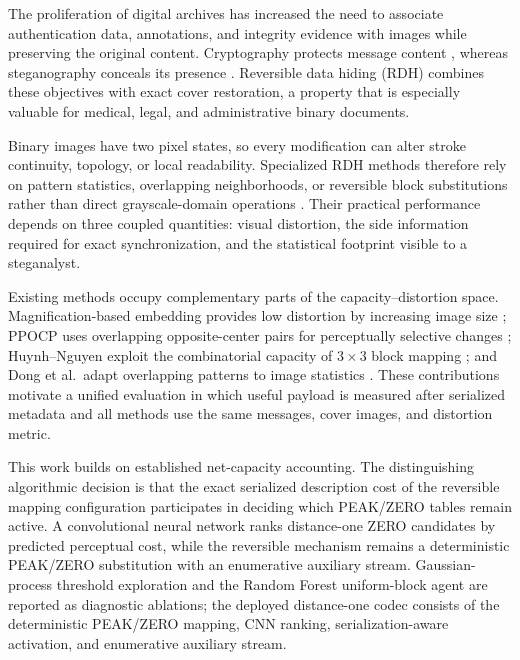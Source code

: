 \documentclass[a4paper,fleqn]{cas-dc}
\newcommand{\RevisionAddBegin}{\begingroup\color{revisionblue}}
\newcommand{\RevisionAddEnd}{\endgroup}
\begin{document}
The proliferation of digital archives has increased the need to associate
authentication data, annotations, and integrity evidence with images while
preserving the original content. Cryptography protects message content
\RevisionAddBegin
\cite{Rivest1978RSA}, whereas steganography conceals its presence
\cite{Johnson2001InformationHiding}. Reversible data hiding (RDH) combines these objectives with
\RevisionAddEnd
exact cover restoration, a property that is especially valuable for medical,
legal, and administrative binary documents.

\RevisionAddBegin
Binary images have two pixel states, so every modification can alter
\RevisionAddEnd
stroke continuity, topology, or local readability. Specialized RDH methods
therefore rely on pattern statistics, overlapping neighborhoods, or reversible
block substitutions rather than direct grayscale-domain operations
\cite{Chhajed2023BlockDiagonal,Huynh2025BlockMapping,Yang2023Large,
Ren2023Sliding,Dong2020Adaptive,Zhang2019Magnification,Yin2020PPOCP,
Yin2020SymmetricFlipping,Ren2019Encrypted,Feng2015Secure,Xuan2008RunLength}. Their practical performance depends
on three coupled quantities: visual distortion, the side information required
for exact synchronization, and the statistical footprint visible to a
steganalyst.

\RevisionAddBegin
Existing methods occupy complementary parts of the capacity--distortion space.
Magnification-based embedding provides low distortion by increasing image size
\cite{Zhang2019Magnification}; PPOCP
\RevisionAddEnd
uses overlapping opposite-center pairs for perceptually selective changes
\cite{Yin2020PPOCP}; Huynh--Nguyen exploit the combinatorial capacity of
$3\times3$ block mapping \cite{Huynh2025BlockMapping}; and Dong et al.\ adapt
overlapping patterns to image statistics \cite{Dong2020Adaptive}. These
contributions motivate a unified evaluation in
which useful payload is measured after serialized metadata and all methods use
\RevisionAddBegin
the same messages, cover images, and distortion metric.
\RevisionAddEnd

\RevisionAddBegin
This work builds on established net-capacity accounting. The distinguishing
algorithmic decision is that the exact serialized description cost of the
reversible mapping configuration participates in deciding which PEAK/ZERO
tables remain active. A convolutional neural network ranks
distance-one ZERO candidates by predicted perceptual cost, while the
reversible mechanism remains a deterministic PEAK/ZERO substitution with an
enumerative auxiliary stream. Gaussian-process threshold exploration and the
Random Forest uniform-block agent are reported as diagnostic ablations; the
deployed distance-one codec consists of the deterministic PEAK/ZERO mapping,
CNN ranking, serialization-aware activation, and enumerative auxiliary stream.
\RevisionAddEnd
\end{document}
